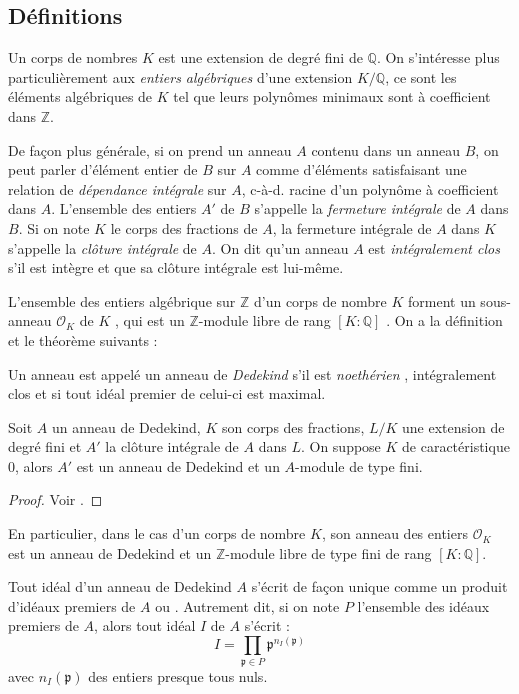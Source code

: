 \documentclass[a4paper]{article} %
\numberwithin{section}{part}
\numberwithin{equation}{section}
\newcommand\QQ{\mathbb{Q}}
\newcommand\ZZ{\mathbb{Z}}
\newcommand\EO{\mathcal{O}}
\begin{document}
\subsection{Définitions}
Un corps de nombres $K$ est une extension de degré fini de $\QQ$. On s'intéresse
plus particulièrement aux \emph{entiers algébriques} d'une extension $K/\QQ$, ce
sont les éléments algébriques de $K$ tel que leurs polynômes minimaux sont à
coefficient dans $\ZZ$.\par 
De façon plus générale, si on prend un anneau $A$ contenu dans un anneau $B$, on
peut parler d'élément entier de $B$ sur $A$ comme d'éléments satisfaisant une 
relation de \emph{dépendance intégrale} sur $A$, c-à-d. racine d'un 
polynôme à coefficient dans $A$. L'ensemble des entiers $A'$ de $B$ s'appelle la
\emph{fermeture intégrale} de $A$ dans $B$. Si on note $K$ le corps des 
fractions de $A$, la fermeture intégrale de $A$ dans $K$ s'appelle la 
\emph{clôture intégrale} de $A$. On dit qu'un anneau $A$ est \emph{intégralement
clos} s'il est intègre et que sa clôture intégrale est lui-même.\par
L'ensemble des entiers algébrique sur $\ZZ$ d'un corps de nombre $K$ forment un
sous-anneau $\EO_K$ de $K$ \cite[p.~35, cor. 2]{Sam}, qui est un $\ZZ$-module 
libre de rang $[K:\QQ]$ \cite[p.~48, cor.]{Sam}. On a la définition et le 
théorème suivants :
\begin{defn}
Un anneau est appelé un anneau de \emph{Dedekind} s'il est \emph{noethérien} 
\cite[p.~55, déf. 1]{Sam}, intégralement clos et si tout idéal premier 
de celui-ci est maximal.
\end{defn}
\begin{thm}
Soit $A$ un anneau de Dedekind, $K$ son corps des fractions, $L/K$ une extension
de degré fini et $A'$ la clôture intégrale de $A$ dans $L$. On suppose $K$ de
caractéristique $0$, alors $A'$ est un anneau de Dedekind et un $A$-module de
type fini.
\end{thm}
\begin{proof}
Voir \cite[p.~59, th. 1]{Sam}.
\end{proof}
\begin{rem}
En particulier, dans le cas d'un corps de nombre $K$, son anneau des entiers
$\EO_K$ est un anneau de Dedekind et un $\ZZ$-module libre de type fini de rang
$[K:\QQ]$.
\end{rem}
Tout idéal d'un anneau de Dedekind $A$ s'écrit de façon unique comme un produit 
d'idéaux premiers de $A$ \cite[p.~60, th. 3]{Sam} ou \cite[§I.6, th. 2]{Lan2}. 
Autrement dit, si on note $P$ l'ensemble des idéaux premiers de $A$, alors tout 
idéal $I$ de $A$ s'écrit :
\begin{equation}
I = \prod_{\mathfrak{p}\in P}{\mathfrak{p}^{n_I(\mathfrak{p})}}
\end{equation}
avec $n_I(\mathfrak{p})$ des entiers presque tous nuls.
\end{document}
